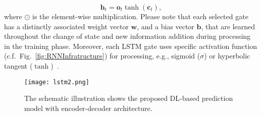 \documentclass[10pt, conference]{IEEEtran}
\begin{document}
\begin{equation*}\label{eq5}
{\mathbf{h}_t} = {\mathbf{o}_t}\tanh ({\mathbf{c}_t}),
\end{equation*}
where $\odot$ is the element-wise multiplication. Please note that each selected gate has a distinctly associated weight vector $\mathbf{w}$, and a bias vector $\mathbf{b}$, that are learned throughout the change of state and new information addition during processing in the training phase.
Moreover, each LSTM gate uses specific activation function (c.f.~Fig.~\ref{fig:RNNInfratructure}) for processing, e.g., sigmoid ($\sigma$) or hyperbolic tangent ($\mathrm{\tanh}$)~\cite[Sec.~3]{zhengtime}.
\begin{figure}
\centering
\texttt{[image: lstm2.png]}
	\caption{The schematic illustration shows the proposed DL-based prediction model with encoder-decoder architecture.}
	\label{fig:s2s}
	\vspace{-10pt}
\end{figure}
\end{document}
